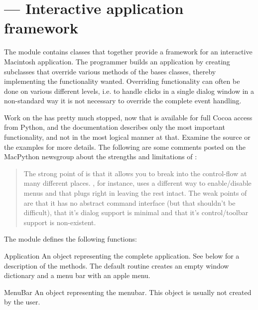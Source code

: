 \section{ ---
         Interactive application framework}



The  module contains classes that together provide a
framework for an interactive Macintosh application. The programmer
builds an application by creating subclasses that override various
methods of the bases classes, thereby implementing the functionality
wanted. Overriding functionality can often be done on various
different levels, i.e. to handle clicks in a single dialog window in a
non-standard way it is not necessary to override the complete event
handling.

Work on the  has pretty much stopped, now that
 is available for full Cocoa access from Python, and the
documentation describes only the most important functionality, and not
in the most logical manner at that. Examine the source or the examples
for more details.  The following are some comments posted on the
MacPython newsgroup about the strengths and limitations of
:

\begin{quotation}
The strong point of  is that it allows you to break
into the control-flow at many different places. , for
instance, uses a different way to enable/disable menus and that plugs
right in leaving the rest intact.  The weak points of
 are that it has no abstract command interface (but
that shouldn't be difficult), that it's dialog support is minimal and
that it's control/toolbar support is non-existent.
\end{quotation}


The  module defines the following functions:


\begin{funcdesc}{Application}{}
An object representing the complete application. See below for a
description of the methods. The default  routine
creates an empty window dictionary and a menu bar with an apple menu.
\end{funcdesc}

\begin{funcdesc}{MenuBar}{}
An object representing the menubar. This object is usually not created
by the user.
\end{funcdesc}

